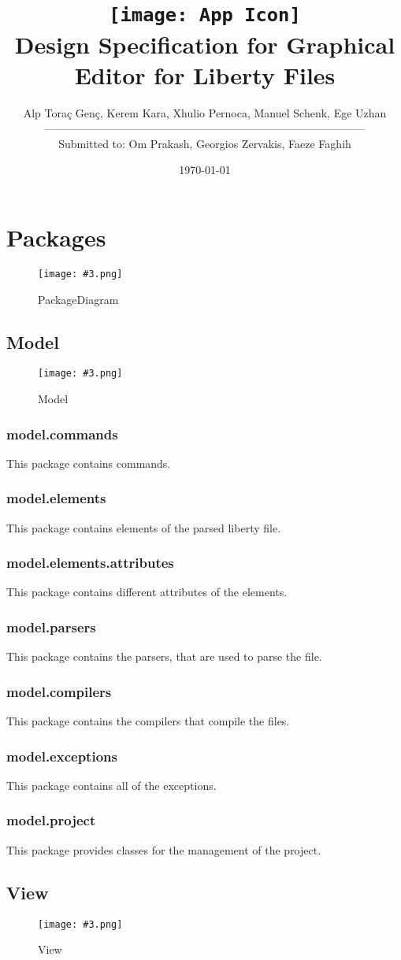 \documentclass[10pt,a4paper]{report}
\title{\texttt{[image: App Icon]}\\Design Specification for Graphical Editor for Liberty Files}
\author{Alp Toraç Genç, Kerem Kara, Xhulio Pernoca, Manuel Schenk, Ege Uzhan \leavevmode \\---------------------------------------------------------------------------------------\\
Submitted to: Om Prakash, Georgios Zervakis, Faeze Faghih}
\date{\today}
\newcommand{\includeimage}[5]{
    \begin{figure}[H]
        #1
        \texttt{[image: \#3.png]}
        \caption{#4}
        \label{fig:#5}
    \end{figure}
}
\begin{document}
\maketitle
\label{sec:title}
\tableofcontents

\chapter{Packages}
    \includeimage{}{0.3}{PackageDiagram}{PackageDiagram}{PackageDiagram}
    \section{Model}
    \includeimage{}{0.1}{Model}{Model}{ModelFirst}{}
    \subsection{model.commands}
    This package contains commands.
    \subsection{model.elements}
    This package contains elements of the parsed liberty file.
    \subsection{model.elements.attributes}
    This package contains different attributes of the elements.
    \subsection{model.parsers}
    This package contains the parsers, that are used to parse the file.
    \subsection{model.compilers}
    This package contains the compilers that compile the files.
    \subsection{model.exceptions}
    This package contains all of the exceptions.
    \subsection{model.project}
    This package provides classes for the management of the project.
    \section{View}
    \includeimage{}{0.035}{View}{View}{View}
\end{document}
